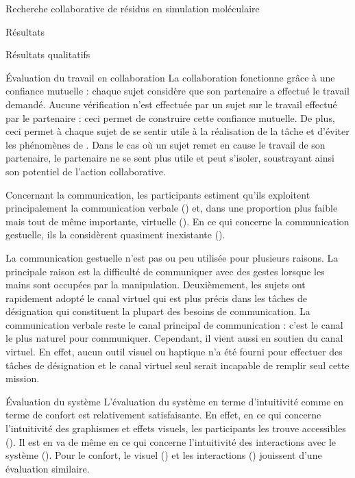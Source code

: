 \documentclass[myfrancais]{mythesis}
\begin{document}
\begin{mychapter}{Recherche collaborative de résidus en simulation moléculaire}
\begin{mysection}{Résultats}
\begin{mysubsection}{Résultats qualitatifs}
\begin{mysubsubsection}{Évaluation du travail en collaboration}
					La collaboration fonctionne grâce à une confiance mutuelle : chaque sujet considère que son partenaire a effectué le travail demandé.
					Aucune vérification n'est effectuée par un sujet sur le travail effectué par le partenaire : ceci permet de construire cette confiance mutuelle.
					De plus, ceci permet à chaque sujet de se sentir utile à la réalisation de la tâche et d'éviter les phénomènes de .
					Dans le cas où un sujet remet en cause le travail de son partenaire, le partenaire ne se sent plus utile et peut s'isoler, soustrayant ainsi son potentiel de l'action collaborative.

					Concernant la communication, les participants estiment qu'ils exploitent principalement la communication verbale () et, dans une proportion plus faible mais tout de même importante, virtuelle ().
					En ce qui concerne la communication gestuelle, ils la considèrent quasiment inexistante ().

					La communication gestuelle n'est pas ou peu utilisée pour plusieurs raisons.
					La principale raison est la difficulté de communiquer avec des gestes lorsque les mains sont occupées par la manipulation.
					Deuxièmement, les sujets ont rapidement adopté le canal virtuel qui est plus précis dans les tâches de désignation qui constituent la plupart des besoins de communication.
					La communication verbale reste le canal principal de communication : c'est le canal le plus naturel pour communiquer.
					Cependant, il vient aussi en soutien du canal virtuel.
					En effet, aucun outil visuel ou haptique n'a été fourni pour effectuer des tâches de désignation et le canal virtuel seul serait incapable de remplir seul cette mission.
				\end{mysubsubsection}
				\begin{mysubsubsection}{Évaluation du système}
					L'évaluation du système en terme d'intuitivité comme en terme de confort est relativement satisfaisante.
					En effet, en ce qui concerne l'intuitivité des graphismes et effets visuels, les participants les trouve accessibles ().
					Il est en va de même en ce qui concerne l'intuitivité des interactions avec le système ().
					Pour le confort, le visuel () et les interactions () jouissent d'une évaluation similaire.


\end{mysubsubsection}
\end{mysubsection}
\end{mysection}
\end{mychapter}
\end{document}
